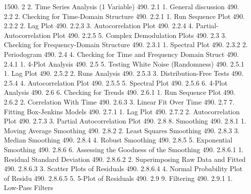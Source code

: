 1500.     2               2. Time Series Analysis (1 Variable)
490.      2.1                   1. General discussion
490.      2.2                   2. Checking for Time-Domain Structure
490.      2.2.1                       1. Run Sequence Plot
490.      2.2.2                       2. Lag Plot
490.      2.2.3                       3. Autocorrelation Plot
490.      2.2.4                       4. Partial-Autocorrelation Plot
490.      2.2.5                       5. Complex Demodulation Plots
490.      2.3                   3. Checking for Frequency-Domain Structure
490.      2.3.1                       1. Spectral Plot
490.      2.3.2                       2. Periodogram
490.      2.4                   4. Checking for Time and Frequency Domain Struct
490.      2.4.1                       1. 4-Plot Analysis
490.      2.5                   5. Testing White Noise (Randomness)
490.      2.5.1                       1. Lag Plot
490.      2.5.2                       2. Runs Analysis
490.      2.5.3                       3. Distribution-Free Tests
490.      2.5.4                       4. Autocorrelation Plot
490.      2.5.5                       5. Spectral Plot
490.      2.5.6                       6. 4-Plot Analysis
490.      2.6                   6. Checking for Trends
490.      2.6.1                       1. Run Sequence Plot
490.      2.6.2                       2. Correlation With Time
490.      2.6.3                       3. Linear Fit Over Time
490.      2.7                   7. Fitting Box-Jenkins Models
490.      2.7.1                       1. Lag Plot
490.      2.7.2                       2. Autocorrelation Plot
490.      2.7.3                       3. Partial Autocorrelation Plot
490.      2.8                   8. Smoothing
490.      2.8.1                       1. Moving Average Smoothing
490.      2.8.2                       2. Least Squares Smoothing
490.      2.8.3                       3. Median Smoothing
490.      2.8.4                       4. Robust Smoothing
490.      2.8.5                       5. Exponential Smoothing
490.      2.8.6                       6. Assessing the Goodness of the Smoothing
490.      2.8.6.1                           1. Residual Standard Deviation
490.      2.8.6.2                           2. Superimposing Raw Data and Fitted
490.      2.8.6.3                           3. Scatter Plots of Residuals
490.      2.8.6.4                           4. Normal Probability Plot of Residu
490.      2.8.6.5                           5. 5-Plot of Residuals
490.      2.9                   9. Filtering
490.      2.9.1                       1. Low-Pass Filters
